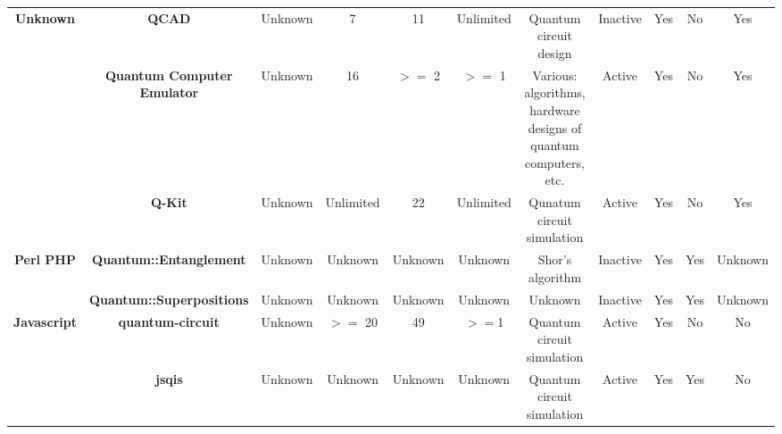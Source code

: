 \documentclass[conference]{IEEEtran}
\begin{document}
\begin{table*}[h!]
{\begin{tabular}{c|c|c|c|c|c|c|c|c|c|c}
	
    \multirow{3}{*}{\textbf{Unknown}} & \textbf{QCAD } & Unknown & 7     & 11    &  \cellcolor{gray!50} Unlimited & Quantum circuit design & Inactive & Yes   & No    & Yes \\    
	           & \textbf{Quantum Computer Emulator } & Unknown & 16    & $>=$ 2  & $>=$ 1  & Various: algorithms, hardware designs of quantum computers, etc. & Active & Yes   & No    & Yes \\
	           & \textbf{Q-Kit } & Unknown & \cellcolor{gray!50} Unlimited & 22    &   \cellcolor{gray!50}  Unlimited   & Qunatum circuit simulation & Active & Yes   & No    & Yes \\ \hline	
	
	
   
   	
   \multirow{2}{*}{\textbf{Perl PHP}} & \textbf{Quantum::Entanglement} & Unknown & Unknown & Unknown & Unknown & Shor's algorithm & Inactive & Yes   & Yes   &  Unknown \\
              & \textbf{Quantum::Superpositions } & Unknown & Unknown & Unknown & Unknown & Unknown & Inactive & Yes   & Yes   & Unknown \\	\hline



   	\multirow{2}{*}{\textbf{Javascript}} & \textbf{quantum-circuit  } & Unknown & $>=$ 20  &  \cellcolor{gray!50} 49    &$>=$1  & Quantum circuit simulation & Active & Yes   & No & No \\
     & \textbf{jsqis } & Unknown & Unknown & Unknown & Unknown & Quantum circuit simulation & Active & Yes   & Yes & No \\ \hline


\end{tabular}}
\end{table*}
\end{document}
